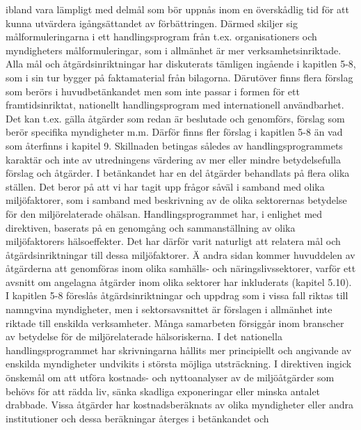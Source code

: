 ibland vara lämpligt med delmål som bör uppnås inom en överskådlig tid för att kunna utvärdera igångsättandet av förbättringen. Därmed skiljer sig målformuleringarna i ett handlingsprogram från t.ex. organisationers och myndigheters målformuleringar, som i allmänhet är mer verksamhetsinriktade.
Alla mål och åtgärdsinriktningar har diskuterats tämligen ingående i kapitlen 5-8, som i sin tur bygger på faktamaterial från bilagorna. Därutöver finns flera förslag som berörs i huvudbetänkandet men som inte passar i formen för ett framtidsinriktat, nationellt handlingsprogram med internationell användbarhet. Det kan t.ex. gälla åtgärder som redan är beslutade och genomförs, förslag som berör specifika myndigheter m.m. Därför finns fler förslag i kapitlen 5-8 än vad som återfinns i kapitel 9. Skillnaden betingas således av handlingsprogrammets karaktär och inte av utredningens värdering av mer eller mindre betydelsefulla förslag och åtgärder.
I betänkandet har en del åtgärder behandlats på flera olika ställen. Det beror på att vi har tagit upp frågor såväl i samband med olika miljöfaktorer, som i samband med beskrivning av de olika sektorernas betydelse för den miljörelaterade ohälsan. Handlingsprogrammet har, i enlighet med direktiven, baserats på en genomgång och sammanställning av olika miljöfaktorers hälsoeffekter. Det har därför varit naturligt att relatera mål och åtgärdsinriktningar till dessa miljöfaktorer. Ä andra sidan kommer huvuddelen av åtgärderna att genomföras inom olika samhälls- och näringslivssektorer, varför ett avsnitt om angelagna åtgärder inom olika sektorer har inkluderats (kapitel 5.10).
I kapitlen 5-8 föreslås åtgärdsinriktningar och uppdrag som i vissa fall riktas till namngvina myndigheter, men i sektorsavsnittet är förslagen i allmänhet inte riktade till enskilda verksamheter. Många samarbeten försiggår inom branscher av betydelse för de miljörelaterade hälsoriskerna. I det nationella handlingsprogrammet har skrivningarna hållits mer principiellt och angivande av enskilda myndigheter undvikits i största möjliga utsträckning.
I direktiven ingick önskemål om att utföra kostnads- och nyttoanalyser av de miljöåtgärder som behövs för att rädda liv, sänka skadliga exponeringar eller minska antalet drabbade. Vissa åtgärder har kostnadsberäknats av olika myndigheter eller andra institutioner och dessa beräkningar återges i betänkandet och

